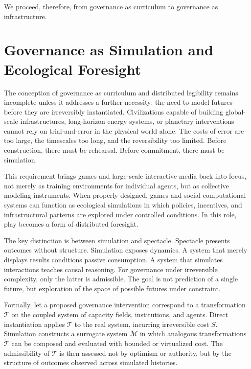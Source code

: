 \documentclass[12pt,oneside]{book}
\begin{document}
We proceed, therefore, from governance as curriculum to governance as infrastructure.

\chapter{Governance as Simulation and Ecological Foresight}

The conception of governance as curriculum and distributed legibility remains incomplete unless it addresses a further necessity: the need to model futures before they are irreversibly instantiated. Civilizations capable of building global-scale infrastructures, long-horizon energy systems, or planetary interventions cannot rely on trial-and-error in the physical world alone. The costs of error are too large, the timescales too long, and the reversibility too limited. Before construction, there must be rehearsal. Before commitment, there must be simulation.

This requirement brings games and large-scale interactive media back into focus, not merely as training environments for individual agents, but as collective modeling instruments. When properly designed, games and social computational systems can function as ecological simulations in which policies, incentives, and infrastructural patterns are explored under controlled conditions. In this role, play becomes a form of distributed foresight.

The key distinction is between simulation and spectacle. Spectacle presents outcomes without structure. Simulation exposes dynamics. A system that merely displays results conditions passive consumption. A system that simulates interactions teaches causal reasoning. For governance under irreversible complexity, only the latter is admissible. The goal is not prediction of a single future, but exploration of the space of possible futures under constraint.

Formally, let a proposed governance intervention correspond to a transformation \(\mathcal{T}\) on the coupled system of capacity fields, institutions, and agents. Direct instantiation applies \(\mathcal{T}\) to the real system, incurring irreversible cost \(S\). Simulation constructs a surrogate system \(\tilde{\mathcal{M}}\) in which analogous transformations \(\tilde{\mathcal{T}}\) can be composed and evaluated with bounded or virtualized cost. The admissibility of \(\mathcal{T}\) is then assessed not by optimism or authority, but by the structure of outcomes observed across simulated histories.
\end{document}
